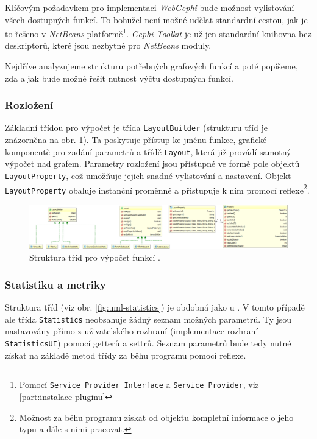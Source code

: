 \documentclass[thesis=M,czech]{FITthesis}[2014/05/6]
\begin{document}
Klíčovým požadavkem pro implementaci \textit{WebGephi} bude možnost vylistování všech dostupných funkcí.
To bohužel není možné udělat standardní cestou, jak je to řešeno v \textit{NetBeans} platformě\footnote{Pomocí \texttt{Service Provider Interface} a \texttt{Service Provider}, viz \ref{part:instalace-pluginu}}. 
\textit{Gephi Toolkit} je už jen standardní knihovna bez deskriptorů, které jsou nezbytné pro \textit{NetBeans} moduly.

Nejdříve analyzujeme strukturu potřebných grafových funkcí a poté popíšeme, zda a jak bude možné řešit nutnost výčtu dostupných funkcí.

\subsubsection{Rozložení}
Základní třídou pro výpočet  je třída \texttt{LayoutBuilder} (strukturu tříd je znázorněna na obr. \ref{fig:uml-layout}). Ta poskytuje přístup ke jménu funkce, grafické komponentě pro zadání parametrů a
třídě \texttt{Layout}, která již provádí samotný výpočet nad grafem. Parametry rozložení jsou přístupné ve formě pole objektů \texttt{LayoutProperty},
což umožňuje jejich snadné vylistování a nastavení. Objekt \texttt{LayoutProperty} obaluje instanční proměnné a přistupuje k nim promocí reflexe\footnote{Možnost 
za běhu programu získat od objektu kompletní informace o jeho typu a dále s nimi pracovat.}.

\begin{figure}\centering
 	\includegraphics[width=1\textwidth]{images/class-diagram/layout}
 	\caption[Struktura tříd pro výpočet funkcí ]{Struktura tříd pro výpočet funkcí .}\label{fig:uml-layout}
\end{figure}



\subsubsection{Statistiku a metriky}
Struktura tříd (viz obr. \ref{fig:uml-statistics}) je obdobná jako u . V tomto případě ale třída \texttt{Statistics} neobsahuje 
žádný seznam možných parametrů. Ty jsou nastavovány přímo z uživatelského rozhraní (implementace rozhraní \texttt{StatisticsUI}) pomocí getterů a settrů.
Seznam parametrů bude tedy nutné získat na základě metod třídy za běhu programu pomocí reflexe.
\end{document}
